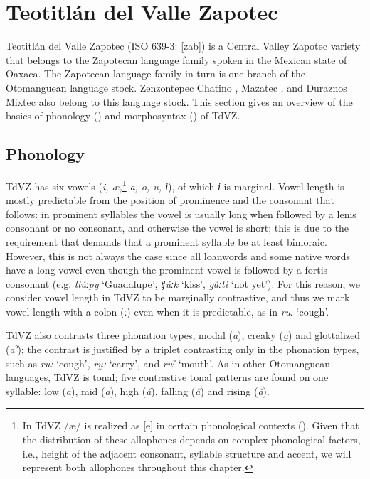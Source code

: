 \documentclass[output=paper]{langscibook}
\begin{document}
\section{Teotitlán del Valle Zapotec}

Teotitlán del Valle Zapotec (ISO 639-3: [zab]) is a Central Valley Zapotec variety that belongs to the Zapotecan language family spoken in the Mexican state of Oaxaca. The Zapotecan language family in turn is one branch of the Otomanguean language stock. Zenzontepec Chatino , Mazatec , and Duraznos Mixtec   also belong to this language stock. This section gives an overview of the basics of phonology () and morphosyntax () of TdVZ.

\subsection{Phonology} 
\label{sec:key:2.1}

TdVZ has six vowels (\textit{i, æ,}\footnote{In TdVZ /æ/ is realized as [e] in certain phonological contexts (\citealt{Uchihara2020a}). Given that the distribution of these allophones depends on complex phonological factors, i.e., height of the adjacent consonant, syllable structure and accent, we will represent both allophones throughout this chapter.} \textit{a, o, u, ɨ}), of which \textit{ɨ} is marginal. Vowel length is mostly predictable from the position of prominence and the consonant that follows: in prominent syllables the vowel is usually long when followed by a lenis consonant or no consonant, and otherwise the vowel is short; this is due to the requirement that demands that a prominent syllable be at least bimoraic. However, this is not always the case since all loanwords and some native words have a long vowel even though the prominent vowel is followed by a fortis consonant (e.g. \textit{llúːpy} `Guadalupe', \textit{ʧúːk} `kiss', \textit{gáːti} `not yet'). For this reason, we consider vowel length in TdVZ to be marginally contrastive, and thus we mark vowel length with a colon (ː) even when it is predictable, as in \textit{ruː} `cough'. 

TdVZ also contrasts three phonation types, modal (\textit{a}), creaky (\textit{a̰}) and glottalized (\textit{aˀ}); the contrast is justified by a triplet contrasting only in the phonation types, such as \textit{ru:} `cough', \textit{rṵ:} `carry', and \textit{ruˀ} `mouth'. As in other Otomanguean languages, TdVZ is tonal; five contrastive tonal patterns are found on one syllable: low (\textit{a}), mid (\textit{ā}), high (\textit{á}), falling (\textit{â}) and rising (\textit{ǎ}).
\end{document}
